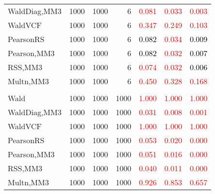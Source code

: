 \documentclass[
]{article}
\begin{document}
\begin{table}[H]
{\begin{tabular}[t]{lrrrrrr}
\hspace{1em}WaldDiag,MM3 & 1000 & 1000 & 6 & \textcolor{red}{0.081} & \textcolor{red}{0.033} & \textcolor{red}{0.003}\\
\hspace{1em}WaldVCF & 1000 & 1000 & 6 & \textcolor{red}{0.347} & \textcolor{red}{0.249} & \textcolor{red}{0.103}\\
\hspace{1em}PearsonRS & 1000 & 1000 & 6 & \textcolor{black}{0.082} & \textcolor{red}{0.034} & \textcolor{black}{0.009}\\
\hspace{1em}Pearson,MM3 & 1000 & 1000 & 6 & \textcolor{black}{0.082} & \textcolor{red}{0.032} & \textcolor{black}{0.007}\\
\hspace{1em}RSS,MM3 & 1000 & 1000 & 6 & \textcolor{red}{0.074} & \textcolor{red}{0.032} & \textcolor{black}{0.006}\\
\hspace{1em}Multn,MM3 & 1000 & 1000 & 6 & \textcolor{red}{0.450} & \textcolor{red}{0.328} & \textcolor{red}{0.168}\\
\addlinespace[0.3em]
\multicolumn{7}{l}{\textbf{1F 15V}}\\
\hspace{1em}Wald & 1000 & 1000 & 1000 & \textcolor{red}{1.000} & \textcolor{red}{1.000} & \vphantom{1} \textcolor{red}{1.000}\\
\hspace{1em}WaldDiag,MM3 & 1000 & 1000 & 1000 & \textcolor{red}{0.031} & \textcolor{red}{0.008} & \textcolor{red}{0.001}\\
\hspace{1em}WaldVCF & 1000 & 1000 & 1000 & \textcolor{red}{1.000} & \textcolor{red}{1.000} & \vphantom{1} \textcolor{red}{1.000}\\
\hspace{1em}PearsonRS & 1000 & 1000 & 1000 & \textcolor{red}{0.053} & \textcolor{red}{0.020} & \textcolor{red}{0.000}\\
\hspace{1em}Pearson,MM3 & 1000 & 1000 & 1000 & \textcolor{red}{0.051} & \textcolor{red}{0.016} & \textcolor{red}{0.000}\\
\hspace{1em}RSS,MM3 & 1000 & 1000 & 1000 & \textcolor{red}{0.040} & \textcolor{red}{0.011} & \textcolor{red}{0.000}\\
\hspace{1em}Multn,MM3 & 1000 & 1000 & 1000 & \textcolor{red}{0.926} & \textcolor{red}{0.853} & \textcolor{red}{0.657}\\

\end{tabular}}
\end{table}
\end{document}
